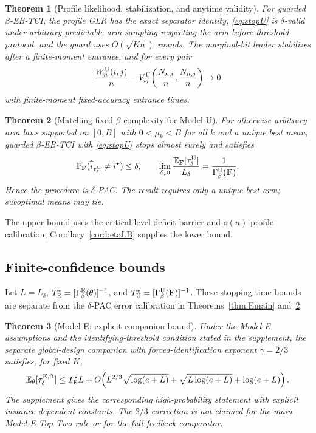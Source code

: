 \documentclass[twoside]{article}
\newtheorem{theorem}{Theorem}
\theoremstyle{definition}
\newcommand{\Pp}{\mathbb P}
\newcommand{\E}{\mathbb E}
\newcommand{\1}{\mathbf 1}
\newcommand{\GammaE}{\Gamma_{\beta}^{\mathrm E}}
\newcommand{\GammaU}{\Gamma_{\beta}^{\mathrm U}}
\newcommand{\Ldelta}{L_\delta}
\begin{document}
\begin{theorem}[Profile likelihood, stabilization, and anytime validity]
\label{thm:Ucore}
For guarded $\beta$-EB-TCI, the profile GLR has the exact separator
identity, \eqref{eq:stopU} is $\delta$-valid under arbitrary predictable arm
sampling respecting the arm-before-threshold protocol, and the guard uses
$O(\sqrt{Kn})$ rounds.  The marginal-bit leader
stabilizes after a finite-moment entrance, and for every pair
\[
\frac{W_n^{\rm U}(i,j)}n-
V_{ij}^{\rm U}\!\left(\frac{N_{n,i}}n,\frac{N_{n,j}}n\right)\to0
\]
with finite-moment fixed-accuracy entrance times.
\end{theorem}

\begin{theorem}[Matching fixed-$\beta$ complexity for Model U]
\label{thm:Umain}
For otherwise arbitrary arm laws supported on $[0,B]$ with $0<\mu_k<B$ for all $k$ and a unique best mean, guarded $\beta$-EB-TCI with \eqref{eq:stopU} stops almost surely and satisfies
\begin{equation}
\Pp_{\mathbf F}(\widehat i_{\tau_\delta^{\rm U}}\neq i^\star)\le\delta,
\qquad
\lim_{\delta\downarrow0}
\frac{\E_{\mathbf F}[\tau_\delta^{\rm U}]}{\Ldelta}
=\frac1{\GammaU(\mathbf F)}.
\label{eq:Umain}
\end{equation}
Hence the procedure is $\delta$-PAC.  The result requires only a unique best arm; suboptimal means may tie.
\end{theorem}

The upper bound uses the critical-level deficit barrier and $o(n)$
profile calibration; Corollary~\ref{cor:betaLB} supplies the lower bound.

\subsection{Finite-confidence bounds}
\label{sec:main-finite}
Let $L=\Ldelta$, $T_{\rm E}^\star=[\GammaE(\theta)]^{-1}$, and
$T_{\rm U}^\star=[\GammaU(\mathbf F)]^{-1}$.  These stopping-time bounds are
separate from the $\delta$-PAC error calibration in
Theorems~\ref{thm:Emain} and~\ref{thm:Umain}.

\begin{theorem}[Model E: explicit companion bound]
\label{thm:main-E-finite}
Under the Model-E assumptions and the identifying-threshold condition stated in
the supplement, the \emph{separate} global-design companion with
forced-identification exponent $\gamma=2/3$ satisfies, for fixed $K$,
\begin{equation}
\E_\theta[\tau_\delta^{\mathrm{E,ft}}]
\le T_{\rm E}^\star L
+O\!\left(
L^{2/3}\sqrt{\log(e+L)}
+\sqrt{L\log(e+L)}+\log(e+L)
\right).
\label{eq:main-E-mean-compact}
\end{equation}
The supplement gives the corresponding high-probability statement with explicit
instance-dependent constants.  The $2/3$ correction is not claimed for the main
Model-E Top-Two rule or for the full-feedback comparator.
\end{theorem}
\end{document}
